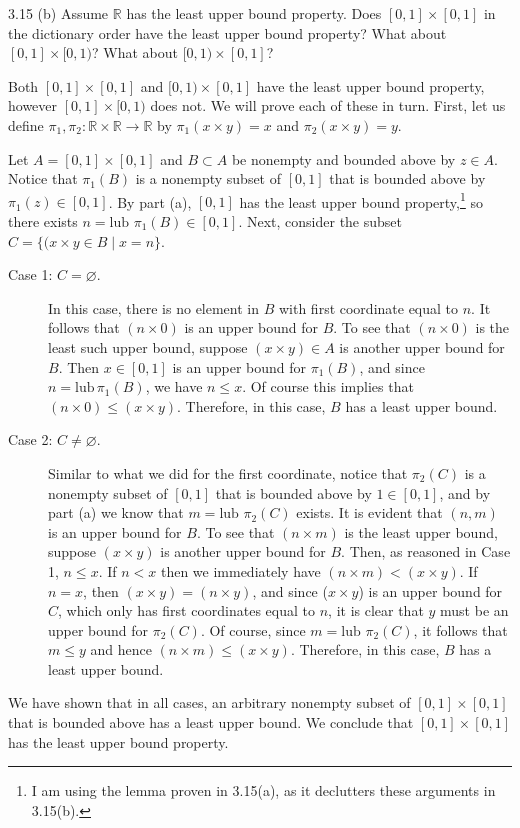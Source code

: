 \documentclass[11pt]{article}
\begin{document}
\begin{ex}{3.15 (b)}
  Assume $\mathbb{R}$ has the least upper bound property. Does $[0, 1] \times [0, 1]$ in the dictionary order have the least upper bound property? What about $[0, 1] \times [0, 1)$? What about $[0,1) \times [0, 1]$?
\end{ex}

\begin{solution}
  Both $[0, 1] \times [0, 1]$ and $[0,1) \times [0, 1]$ have the least upper bound
  property, however $[0, 1] \times [0, 1)$ does not. We will prove each of these in turn.
  First, let us define
  \mbox{$\pi_1, \pi_2 : \mathbb{R} \times \mathbb{R} \to \mathbb{R}$}
  by $\pi_1(x \times y) = x$ and $\pi_2(x \times y) = y.$

  Let $A = [0, 1] \times [0, 1]$ and $B \subset A$ be nonempty and bounded above by $z \in
  A$. Notice that $\pi_1(B)$ is a nonempty subset of $[0,1]$ that is bounded above by
  $\pi_1(z) \in [0, 1]$. By part (a), $[0,1]$ has the least upper bound
  property,\footnote{I am using the lemma proven in 3.15(a), as it declutters these
  arguments in 3.15(b).}
  so there exists $n
  = \text{lub } \pi_1(B) \in [0, 1]$. Next, consider the subset $C = \{
  (x \times y \in B \mid x = n\}$.
  \begin{description}
    \item[Case 1: $C = \varnothing$.]
      In this case, there is no element in $B$ with first coordinate equal to $n$. It
      follows that $(n \times 0)$ is an upper bound for $B$. To see that $(n \times 0)$ is
      the least such upper bound, suppose $(x \times y) \in A$ is another upper bound for $B$.
      Then $x \in [0, 1]$ is an upper bound for $\pi_1(B)$, and
      since $n = \text{lub}\, \pi_1(B)$, we have $n \leq x$. Of course this implies
      that $(n \times 0) \leq (x \times y)$. Therefore, in this case, $B$ has a least
      upper bound.
    \item[Case 2: $C \ne \varnothing$.]
      Similar to what we did for the first coordinate, notice that $\pi_2(C)$ is a nonempty
      subset of $[0, 1]$ that is bounded above by $1 \in [0, 1]$, and by part (a) we know
      that $m = \text{lub } \pi_2(C)$ exists. It is evident that $(n, m)$ is an upper
      bound for $B$. To see that $(n \times m)$ is the least upper bound, suppose $(x \times
      y)$ is another upper bound for $B$. Then, as reasoned in Case 1, $n \leq x$. If $n
      < x$ then we immediately have $(n \times m) < (x \times y)$. If $n = x$, then $(x
      \times y) = (n \times y)$, and since ($x \times y$) is an upper bound for $C$, which
      only has first coordinates equal to $n$, it is clear that
      $y$ must be an upper bound for $\pi_2(C)$. Of course, since $m = \text{lub
      }\pi_2(C)$, it follows that $m \le y$
      and hence $(n \times m) \le (x \times y)$. Therefore, in this case, $B$ has a least
      upper bound.
  \end{description}
  We have shown that in all cases, an arbitrary nonempty subset of $[0, 1] \times [0,
  1]$ that is bounded above has a least upper bound. We conclude that $[0, 1] \times [0,
  1]$ has the least upper bound property.


\end{solution}
\end{document}

